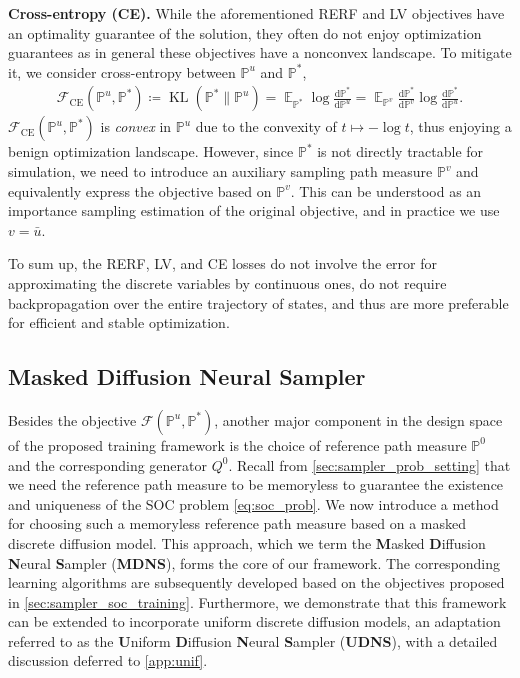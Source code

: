 \documentclass{article}
\theoremstyle{remark}
\renewcommand{\P}{\mathbb{P}}
\newcommand{\E}{\operatorname{\mathbb{E}}}
\newcommand{\de}[2]{\frac{\mathrm{d}#1}{\mathrm{d}#2}} %
\newcommand{\kl}{\operatorname{KL}}
\newcommand{\cF}{\mathcal{F}}
\newcommand{\ub}{{\bar{u}}}
\begin{document}
\textbf{Cross-entropy (CE).} While the aforementioned RERF and LV objectives have an optimality guarantee of the solution, they often do not enjoy optimization guarantees as in general these objectives have a nonconvex landscape. To mitigate it, we consider cross-entropy between $\P^u$ and $\P^*$,
\begin{align}
\label{eq:obj_ce}
\cF_{\mathrm{CE}}(\P^u, \P^*)\coloneqq \kl(\P^* \| \P^u) = \E_{\P^*}\log\de{\P^*}{\P^u} = \E_{\P^v} \de{\P^*}{\P^v} \log \de{\P^*}{\P^u}.
\end{align}
$\cF_{\mathrm{CE}}(\P^u, \P^*)$ is \textit{convex} in $\P^u$ due to the convexity of $t\mapsto-\log t$, thus enjoying a benign optimization landscape. However, since $\P^*$ is not directly tractable for simulation, we need to introduce an auxiliary sampling path measure $\P^v$ and equivalently express the objective based on $\P^v$. This can be understood as an importance sampling estimation of the original objective, and in practice we use $v = \ub$. 

To sum up, the RERF, LV, and CE losses do not involve the error for approximating the discrete variables by continuous ones, do not require backpropagation over the entire trajectory of states, and thus are more preferable for efficient and stable optimization.

\subsection{Masked Diffusion Neural Sampler}
\label{sec:sampler_mask}
Besides the objective $\cF(\P^u, \P^*)$, another major component in the design space of the proposed training framework is the choice of reference path measure $\P^0$ and the corresponding generator $Q^0$. Recall from \cref{sec:sampler_prob_setting} that we need the reference path measure to be memoryless to guarantee the existence and uniqueness of the SOC problem \cref{eq:soc_prob}.
%
%
%
%
%
We now introduce a method for choosing such a memoryless reference path measure based on a masked discrete diffusion model. This approach, which we term the \textbf{M}asked \textbf{D}iffusion \textbf{N}eural \textbf{S}ampler (\textbf{MDNS}), forms the core of our framework. The corresponding learning algorithms are subsequently developed based on the objectives proposed in \cref{sec:sampler_soc_training}. Furthermore, we demonstrate that this framework can be extended to incorporate uniform discrete diffusion models, an adaptation referred to as the \textbf{U}niform \textbf{D}iffusion \textbf{N}eural \textbf{S}ampler (\textbf{UDNS}), with a detailed discussion deferred to \cref{app:unif}.
\end{document}
